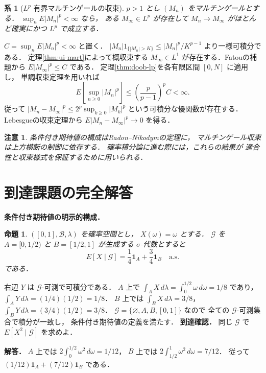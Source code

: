 \documentclass[a5paper,10pt,onecolumn]{jsarticle}
\makeatletter
\theoremstyle{mathnotetheorem}
\newtheorem{proposition}[theorem]{命題}
\newtheorem{corollary}[theorem]{系}
\newtheorem{remark}[theorem]{注意}
\renewcommand{\proofname}{証明}
\renewenvironment{proof}[1][\proofname]{%
  \par\pushQED{\qed}\normalfont\topsep4\p@\@plus2\p@\relax
  \trivlist\item[\hskip\labelsep\bfseries #1]\ignorespaces
}{\popQED\endtrivlist\@endpefalse}
\makeatother
\begin{document}
\begin{corollary}[$L^p$ 有界マルチンゲールの収束]\label{cor:lp-mart}
$p>1$ とし $(M_n)$ をマルチンゲールとする．
$\sup_nE|M_n|^p<\infty$ なら，
ある $M_\infty\in L^p$ が存在して
$M_n\to M_\infty$ がほとんど確実にかつ
$L^p$ で成立する．
\end{corollary}
\begin{proof}
$C=\sup_nE|M_n|^p<\infty$ と置く．
$|M_n|1_{\{|M_n|>K\}}
 \le |M_n|^p/K^{p-1}$ より一様可積分である．
定理\ref{thm:ui-mart}によって概収束する
$M_\infty\in L^1$ が存在する．Fatouの補題から
$E|M_\infty|^p\le C$ である．
定理\ref{thm:doob-lp}を各有限区間 $[0,N]$ に適用し，
単調収束定理を用いれば
\[
 E\left[\sup_{n\ge0}|M_n|^p\right]
 \le\left(\frac p{p-1}\right)^p C<\infty.
\]
従って
$|M_n-M_\infty|^p
 \le2^p\sup_{k\ge0}|M_k|^p$
という可積分な優関数が存在する．
Lebesgueの収束定理から
$E|M_n-M_\infty|^p\to0$ を得る．
\end{proof}

\begin{remark}
条件付き期待値の構成はRadon--Nikodymの定理に，
マルチンゲール収束は上方横断の制御に依存する．
確率積分論に進む際には，これらの結果が
適合性と収束様式を保証するために用いられる．
\end{remark}

\section{到達課題の完全解答}
\noindent\textbf{条件付き期待値の明示的構成．}
\begin{proposition}
$([0,1],\mathcal B,\lambda)$ を確率空間とし，
$X(\omega)=\omega$ とする．
$\mathcal G$ を
$A=[0,1/2)$ と $B=[1/2,1]$ が生成する
$\sigma$-代数とすると
\[
E[X\mid\mathcal G]
=\frac14\mathbf1_A+\frac34\mathbf1_B
\quad\text{a.s.}
\]
である．
\end{proposition}
\begin{proof}
右辺 $Y$ は $\mathcal G$-可測で可積分である．
$A$ 上で
$\int_A X\,d\lambda=\int_0^{1/2}\omega\,d\omega=1/8$
であり，
$\int_A Y\,d\lambda=(1/4)(1/2)=1/8$．
$B$ 上では
$\int_BX\,d\lambda=3/8$，
$\int_BY\,d\lambda=(3/4)(1/2)=3/8$．
$\mathcal G=\{\varnothing,A,B,[0,1]\}$ なので
全ての $\mathcal G$-可測集合で積分が一致し，
条件付き期待値の定義を満たす．
\end{proof}
\noindent\textbf{到達確認．}
同じ $\mathcal G$ で $E[X^2\mid\mathcal G]$ を求めよ．
\par\noindent\textbf{解答．}
$A$ 上では
$2\int_0^{1/2}\omega^2\,d\omega=1/12$，
$B$ 上では
$2\int_{1/2}^1\omega^2\,d\omega=7/12$．
従って $(1/12)\mathbf1_A+(7/12)\mathbf1_B$ である．
\end{document}
